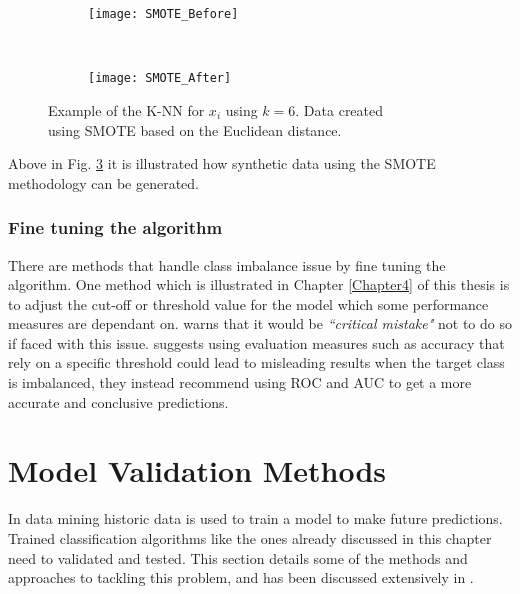 \begin{figure}[H]
	\centering
	\begin{subfigure}[b]{0.32\textwidth}
		\captionsetup{font=scriptsize}
		\texttt{[image: SMOTE\_Before]}\caption{}
		\label{fig:SMOTE_Before}
	\end{subfigure}  ~\quad
	\begin{subfigure}[b]{0.32\textwidth}
		\captionsetup{font=scriptsize}
		\texttt{[image: SMOTE\_After]}
		\caption{}
		\label{fig:SMOTE_After}
	\end{subfigure}
	\caption{Example of the K-NN for $x_i$ using $k = 6$. Data created \\ using SMOTE based on the Euclidean distance.\\
		\cite[Source:][]{he_learning_2009}}
	\label{fig:smoteExample}
\end{figure}

Above in Fig. \ref{fig:smoteExample} it is illustrated how synthetic data using the SMOTE methodology can be generated.


\subsubsection{Fine tuning the algorithm}
There are methods that handle class imbalance issue by fine tuning the algorithm. One method which is illustrated in Chapter \ref{Chapter4} of this thesis is to adjust the cut-off or threshold value for the model which some performance measures are dependant on. \cite{provost_machine_2000} warns that it would be \textit{``critical mistake"} not to do so if faced with this issue. \cite{chawla_editorial:_2004} suggests using evaluation measures such as accuracy that rely on a specific threshold could lead to misleading results when the target class is imbalanced, they instead recommend using ROC and AUC to get a more accurate and conclusive predictions.


\section{Model Validation Methods}\label{sec:modelValid}
In data mining historic data is used to train a model to make future predictions. Trained classification algorithms like the ones already discussed in this chapter need to validated and tested. This section details some of the methods and approaches to tackling this problem, and has been discussed extensively in \citep{refaeilzadeh_cross-validation_2009}.

